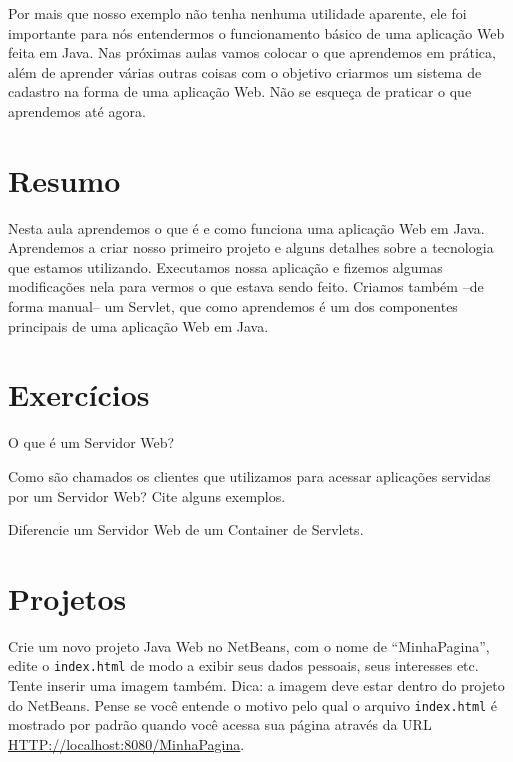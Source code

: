 Por mais que nosso exemplo não tenha nenhuma utilidade aparente, ele foi importante para nós entendermos o funcionamento básico de uma aplicação Web feita em Java. Nas próximas aulas vamos colocar o que aprendemos em prática, além de aprender várias outras coisas com o objetivo criarmos um sistema de cadastro na forma de uma aplicação Web. Não se esqueça de praticar o que aprendemos até agora. 


\section{Resumo}

Nesta aula aprendemos o que é e como funciona uma aplicação Web em Java. Aprendemos a criar nosso primeiro projeto e alguns detalhes sobre a tecnologia que estamos utilizando. Executamos nossa aplicação e fizemos algumas modificações nela para vermos o que estava sendo feito. Criamos também –de forma manual– um Servlet, que como aprendemos é um dos componentes principais de uma aplicação Web em Java.


\section{Exercícios}

\begin{exercicioSemArquivo}{}{}{}
    O que é um Servidor Web?
\end{exercicioSemArquivo}

\begin{exercicioSemArquivo}{}{}{}
    Como são chamados os clientes que utilizamos para acessar aplicações servidas por um Servidor Web? Cite alguns exemplos.
\end{exercicioSemArquivo}

\begin{exercicioSemArquivo}{}{}{}
    Diferencie um Servidor Web de um Container de Servlets.
\end{exercicioSemArquivo}


\section{Projetos}

\begin{projetoSemArquivo}{}{}{}
    Crie um novo projeto Java Web no NetBeans, com o nome de ``MinhaPagina'', edite o \texttt{index.html} de modo a exibir seus dados pessoais, seus interesses etc. Tente inserir uma imagem também. Dica: a imagem deve estar dentro do projeto do NetBeans. Pense se você entende o motivo pelo qual o arquivo \texttt{index.html} é mostrado por padrão quando você acessa sua página através da URL \url{HTTP://localhost:8080/MinhaPagina}.
\end{projetoSemArquivo}

